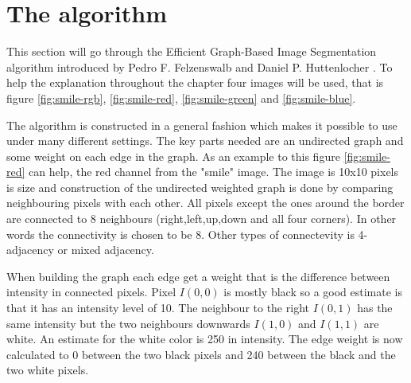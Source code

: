 \section{The algorithm}
This section will go through the Efficient Graph-Based Image Segmentation
algorithm introduced by Pedro F. Felzenswalb and Daniel P. Huttenlocher \cite{felzenszwalb2004}.
To help the explanation throughout the chapter four images will be used, that is figure \ref{fig:smile-rgb},
\ref{fig:smile-red}, \ref{fig:smile-green} and \ref{fig:smile-blue}.

The algorithm is constructed in a general fashion which makes it possible to use
under many different settings. The key parts needed are an undirected graph and
some weight on each edge in the graph. As an example to this figure \ref{fig:smile-red}
can help, the red channel from the "smile" image. The image is 10x10 pixels is
size and construction of the undirected weighted graph is done by comparing
neighbouring pixels with each other. All pixels except the ones around the border
are connected to 8 neighbours (right,left,up,down and all four corners).
In other words the connectivity is chosen to be 8. Other types of connectevity
is 4-adjacency or mixed adjacency.


When building the graph each edge get a weight that is the difference between
intensity in connected pixels. Pixel \(I(0,0)\) is mostly black so a good estimate
is that it has an intensity level of 10. The neighbour to the right \(I(0,1)\) has
the same intensity but the two neighbours downwards \(I(1,0)\) and \(I(1,1)\) are
white. An estimate for the white color is 250 in intensity. The edge weight is
now calculated to 0 between the two black pixels and 240 between the black and the
two white pixels.

